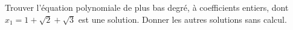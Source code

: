 Trouver l'équation polynomiale de plus bas degré, à coefficients entiers, dont $x_1 = 1 + \sqrt{2} + \sqrt{3}$ est une solution. Donner les autres solutions sans calcul.
